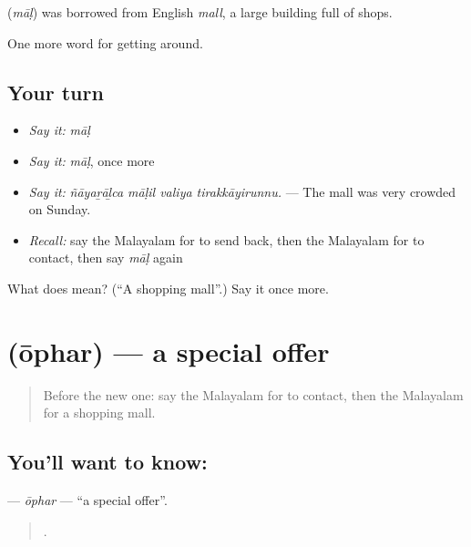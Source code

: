 \begin{cousinweb}
\textbf{} (\emph{māḷ}) was borrowed from English \emph{mall}, a large building full of shops.
\end{cousinweb}

\begin{grammarlens}[title={What you've built}]
One more word for getting around.
\end{grammarlens}

\subsection*{Your turn}
\begin{itemize}
\raggedright
  \item \emph{Say it:} \emph{māḷ}
  \item \emph{Say it:} \emph{māḷ}, once more
  \item \emph{Say it:} \emph{ñāyaṟāḻca māḷil valiya tirakkāyirunnu.} — The mall was very crowded on Sunday.
  \item \emph{Recall:} say the Malayalam for to send back, then the Malayalam for to contact, then say \emph{māḷ} again
\end{itemize}

\begin{tcolorbox}[breakable,colback=teal!4,colframe=teal!35!black,title={Before you move on}]
What does  mean? (\textquotedblleft{}A shopping mall\textquotedblright{}.) Say it once more.
\end{tcolorbox}
\section[\texorpdfstring{\ml{ഓഫർ} (ōphar)}{ഓഫർ (ōphar)}]{ (ōphar) — a special offer}

\label{lesson:ML-C491-ophar}



\begin{quote}
Before the new one: say the Malayalam for to contact, then the Malayalam for a shopping mall.
\end{quote}

\subsection*{You'll want to know: }
\textbf{} — \emph{ōphar} — \textquotedblleft{}a special offer\textquotedblright{}.

\begin{quote}
        .
\end{quote}

